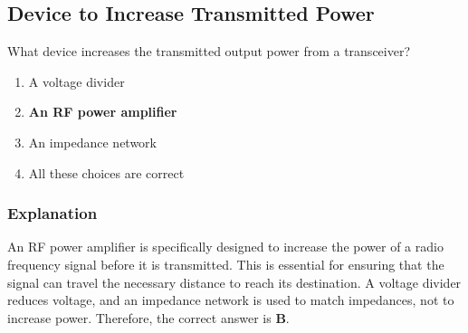 \subsection{Device to Increase Transmitted Power}
\label{T7A10}

\begin{tcolorbox}[colback=gray!10!white,colframe=black!75!black,title=T7A10]
What device increases the transmitted output power from a transceiver?
\begin{enumerate}[noitemsep]
    \item A voltage divider
    \item \textbf{An RF power amplifier}
    \item An impedance network
    \item All these choices are correct
\end{enumerate}
\end{tcolorbox}

\subsubsection*{Explanation}
An RF power amplifier is specifically designed to increase the power of a radio frequency signal before it is transmitted. This is essential for ensuring that the signal can travel the necessary distance to reach its destination. A voltage divider reduces voltage, and an impedance network is used to match impedances, not to increase power. Therefore, the correct answer is \textbf{B}.